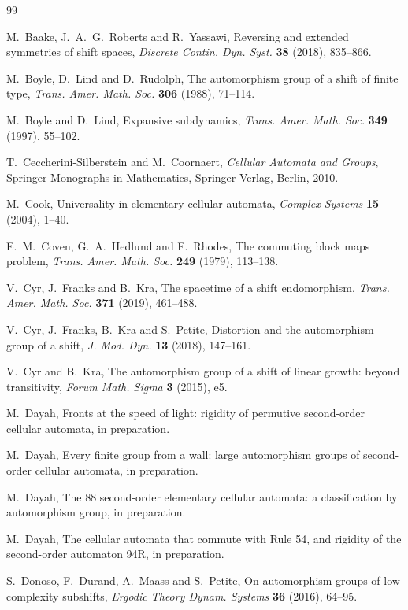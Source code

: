 \documentclass[11pt]{amsart}
\theoremstyle{definition}
\theoremstyle{remark}
\theoremstyle{plain}
\begin{document}
\begin{thebibliography}{99}

 M.~Baake, J.~A.~G.~Roberts and R.~Yassawi, Reversing and extended symmetries of shift spaces, \emph{Discrete Contin. Dyn. Syst.} \textbf{38} (2018), 835--866.

 M.~Boyle, D.~Lind and D.~Rudolph, The automorphism group of a shift of finite type, \emph{Trans. Amer. Math. Soc.} \textbf{306} (1988), 71--114.

 M.~Boyle and D.~Lind, Expansive subdynamics, \emph{Trans. Amer. Math. Soc.} \textbf{349} (1997), 55--102.

 T.~Ceccherini-Silberstein and M.~Coornaert, \emph{Cellular Automata and Groups}, Springer Monographs in Mathematics, Springer-Verlag, Berlin, 2010.

 M.~Cook, Universality in elementary cellular automata, \emph{Complex Systems} \textbf{15} (2004), 1--40.

 E.~M.~Coven, G.~A.~Hedlund and F.~Rhodes, The commuting block maps problem, \emph{Trans. Amer. Math. Soc.} \textbf{249} (1979), 113--138.

 V.~Cyr, J.~Franks and B.~Kra, The spacetime of a shift endomorphism, \emph{Trans. Amer. Math. Soc.} \textbf{371} (2019), 461--488.

 V.~Cyr, J.~Franks, B.~Kra and S.~Petite, Distortion and the automorphism group of a shift, \emph{J. Mod. Dyn.} \textbf{13} (2018), 147--161.

 V.~Cyr and B.~Kra, The automorphism group of a shift of linear growth: beyond transitivity, \emph{Forum Math. Sigma} \textbf{3} (2015), e5.

 M.~Dayah, Fronts at the speed of light: rigidity of permutive second-order cellular automata, in preparation.

 M.~Dayah, Every finite group from a wall: large automorphism groups of second-order cellular automata, in preparation.

 M.~Dayah, The 88 second-order elementary cellular automata: a classification by automorphism group, in preparation.

 M.~Dayah, The cellular automata that commute with Rule 54, and rigidity of the second-order automaton 94R, in preparation.

 S.~Donoso, F.~Durand, A.~Maass and S.~Petite, On automorphism groups of low complexity subshifts, \emph{Ergodic Theory Dynam. Systems} \textbf{36} (2016), 64--95.


\end{thebibliography}
\end{document}

